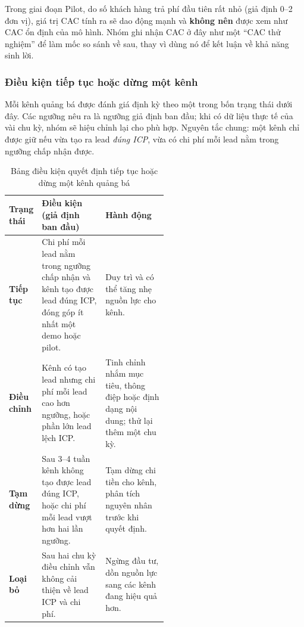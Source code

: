 Trong giai đoạn Pilot, do số khách hàng trả phí đầu tiên rất nhỏ (giả định 0--2 đơn vị), giá trị CAC tính ra sẽ dao động mạnh và \textbf{không nên} được xem như CAC ổn định của mô hình. Nhóm ghi nhận CAC ở đây như một ``CAC thử nghiệm'' để làm mốc so sánh về sau, thay vì dùng nó để kết luận về khả năng sinh lời.

\subsubsection{Điều kiện tiếp tục hoặc dừng một kênh}

Mỗi kênh quảng bá được đánh giá định kỳ theo một trong bốn trạng thái dưới đây. Các ngưỡng nêu ra là ngưỡng giả định ban đầu; khi có dữ liệu thực tế của vài chu kỳ, nhóm sẽ hiệu chỉnh lại cho phù hợp. Nguyên tắc chung: một kênh chỉ được giữ nếu vừa tạo ra lead \emph{đúng ICP}, vừa có chi phí mỗi lead nằm trong ngưỡng chấp nhận được.

\begin{table}[H]
    \centering
    \footnotesize
    \setlength{\tabcolsep}{4pt}
    \renewcommand{\arraystretch}{1.3}
    \caption{Bảng điều kiện quyết định tiếp tục hoặc dừng một kênh quảng bá}
    \label{tab:pa3-kpi-kenh}
    \begin{tabularx}{\linewidth}{@{}L{0.13\linewidth} L{0.40\linewidth} Y@{}}
        \toprule
        \textbf{Trạng thái} & \textbf{Điều kiện (giả định ban đầu)} & \textbf{Hành động} \\ \midrule
        \textbf{Tiếp tục} & Chi phí mỗi lead nằm trong ngưỡng chấp nhận và kênh tạo được lead đúng ICP, đóng góp ít nhất một demo hoặc pilot. & Duy trì và có thể tăng nhẹ nguồn lực cho kênh. \\
        \textbf{Điều chỉnh} & Kênh có tạo lead nhưng chi phí mỗi lead cao hơn ngưỡng, hoặc phần lớn lead lệch ICP. & Tinh chỉnh nhắm mục tiêu, thông điệp hoặc định dạng nội dung; thử lại thêm một chu kỳ. \\
        \textbf{Tạm dừng} & Sau 3--4 tuần kênh không tạo được lead đúng ICP, hoặc chi phí mỗi lead vượt hơn hai lần ngưỡng. & Tạm dừng chi tiền cho kênh, phân tích nguyên nhân trước khi quyết định. \\
        \textbf{Loại bỏ} & Sau hai chu kỳ điều chỉnh vẫn không cải thiện về lead ICP và chi phí. & Ngừng đầu tư, dồn nguồn lực sang các kênh đang hiệu quả hơn. \\
        \bottomrule
    \end{tabularx}
\end{table}
